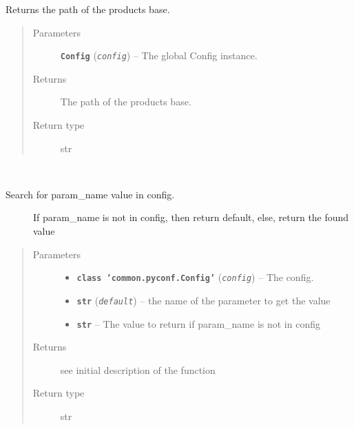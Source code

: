 \documentclass[a4paper,10pt,english]{sphinxmanual}
\begin{document}

\begin{fulllineitems}
\label{commands/apidoc/src:src.utilsSat.get_base_path}
Returns the path of the products base.
\begin{quote}\begin{description}
\item[{Parameters}] \leavevmode
\textbf{\texttt{Config}} (\emph{\texttt{config}}) -- The global Config instance.

\item[{Returns}] \leavevmode
The path of the products base.

\item[{Return type}] \leavevmode
str

\end{description}\end{quote}

\end{fulllineitems}


\begin{fulllineitems}
\label{commands/apidoc/src:src.utilsSat.get_cfg_param}~\begin{description}
\item[{Search for param\_name value in config.}] \leavevmode
If param\_name is not in config, then return default,
else, return the found value

\end{description}
\begin{quote}\begin{description}
\item[{Parameters}] \leavevmode\begin{itemize}
\item {} 
\textbf{\texttt{class 'common.pyconf.Config'}} (\emph{\texttt{config}}) -- The config.

\item {} 
\textbf{\texttt{str}} (\emph{\texttt{default}}) -- the name of the parameter to get the value

\item {} 
\textbf{\texttt{str}} -- The value to return if param\_name is not in config

\end{itemize}

\item[{Returns}] \leavevmode
see initial description of the function

\item[{Return type}] \leavevmode
str

\end{description}\end{quote}

\end{fulllineitems}
\end{document}

